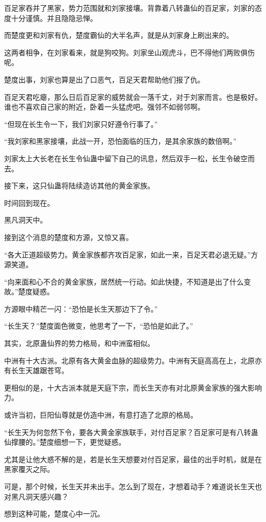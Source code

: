\begin{this_body}
百足家吞并了黑家，势力范围就和刘家接壤。背靠着八转蛊仙的百足家，刘家的态度十分谨慎。并且隐隐忌惮。

而楚度更和刘家有仇，楚度霸仙的大半名声，就是从刘家身上刷出来的。

这两者相争，在刘家看来，就是狗咬狗。刘家坐山观虎斗，巴不得他们两败俱伤呢。

楚度出事，刘家也算是出了口恶气，百足天君帮助他们报了仇。

百足天君吃瘪，那么日后百足家的威势就会一落千丈，对于刘家而言。也是极好。谁也不喜欢自己家的附近，卧着一头猛虎吧。强邻不如弱邻啊。

“但现在长生令一下，我们刘家只好遵令行事了。”

“我刘家和黑家接壤，此战一开，恐怕面临的压力，是其余家族的数倍啊。”

刘家太上大长老在长生令仙蛊中留下自己的讯息，然后双手一松，长生令破空而去。

接下来，这只仙蛊将陆续造访其他的黄金家族。

时间回到现在。

黑凡洞天中。

接到这个消息的楚度和方源，又惊又喜。

“各大正道超级势力。黄金家族都齐攻百足家，如此一来，百足天君必退无疑。”方源笑道。

“向来面和心不合的黄金家族，居然统一行动。如此快捷，不知道是出了什么变故。”楚度疑惑。

方源眼中精芒一闪：“恐怕是长生天那边下了令。”

“长生天？”楚度面色微变，他思考了一下，“恐怕是如此了。”

其实，北原蛊仙界的势力格局，和中洲蛮相似。

中洲有十大古派。北原有各大黄金血脉的超级势力。中洲有天庭高高在上，北原亦有长生天雄踞苍穹。

更相似的是，十大古派本就是天庭下宗，而长生天亦有对北原黄金家族的强大影响力。

或许当初，巨阳仙尊就是仿造中洲，有意打造了北原的格局。

“长生天为何忽然下令，要各大黄金家族联手，对付百足家？百足家可是有八转蛊仙撑腰的。”楚度细想一下，更觉疑惑。

尤其是让他大惑不解的是，若是长生天想要对付百足家，最佳的出手时机，就是在黑家覆灭之际。

可是，那个时候，长生天并未出手。怎么到了现在，才想着动手？难道说长生天也对黑凡洞天感兴趣？

想到这种可能，楚度心中一沉。


\end{this_body}
